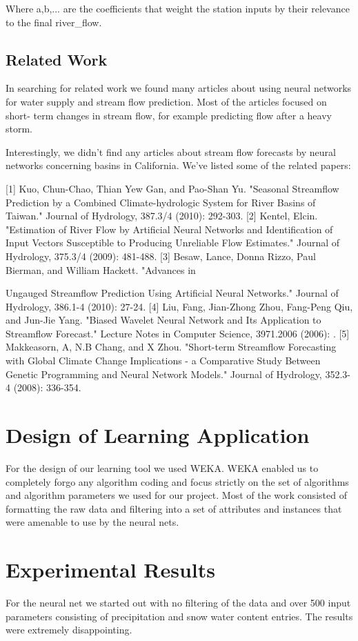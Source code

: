 \documentclass[conference]{IEEEtran}
\begin{document}
Where a,b,... are the coefficients that weight the station inputs by their relevance
to the final river\_flow.


\subsection{Related Work}
In searching for related work we found many articles about using neural networks
for water supply and stream flow prediction. Most of the articles focused on short-
term changes in stream flow, for example predicting flow after a heavy storm.

Interestingly, we didn’t find any articles about stream flow forecasts by neural
networks concerning basins in California. We’ve listed some of the related
papers:

[1] Kuo, Chun-Chao, Thian Yew Gan, and Pao-Shan Yu. "Seasonal Streamflow
Prediction by a Combined Climate-hydrologic System for River Basins of
Taiwan." Journal of Hydrology, 387.3/4 (2010): 292-303.
[2] Kentel, Elcin. "Estimation of River Flow by Artificial Neural Networks and
Identification of Input Vectors Susceptible to Producing Unreliable Flow
Estimates." Journal of Hydrology, 375.3/4 (2009): 481-488.
[3] Besaw, Lance, Donna Rizzo, Paul Bierman, and William Hackett. "Advances in

Ungauged Streamflow Prediction Using Artificial Neural Networks." Journal of
Hydrology, 386.1-4 (2010): 27-24.
[4] Liu, Fang, Jian-Zhong Zhou, Fang-Peng Qiu, and Jun-Jie Yang. "Biased Wavelet
Neural Network and Its Application to Streamflow Forecast." Lecture Notes in
Computer Science, 3971.2006 (2006): .
[5] Makkeasorn, A, N.B Chang, and X Zhou. "Short-term Streamflow Forecasting with
Global Climate Change Implications - a Comparative Study Between Genetic
Programming and Neural Network Models." Journal of Hydrology, 352.3-4 (2008):
336-354.

\section{Design of Learning Application}
For the design of our learning tool we used WEKA. WEKA enabled us to
completely forgo any algorithm coding and focus strictly on the set of algorithms
and algorithm parameters we used for our project. Most of the work consisted
of formatting the raw data and filtering into a set of attributes and instances that
were amenable to use by the neural nets.

\section{Experimental Results}
For the neural net we started out with no filtering of the data and over 500 input
parameters consisting of precipitation and snow water content entries. The
results were extremely disappointing.
\end{document}
